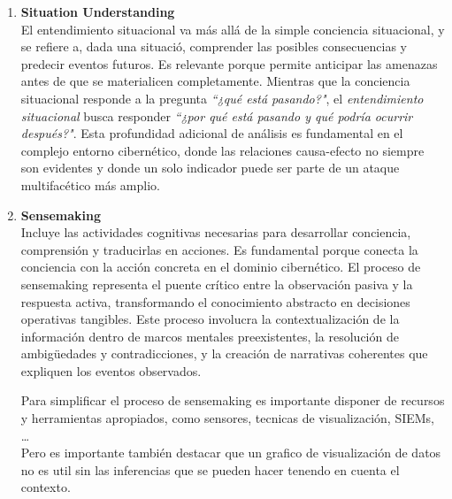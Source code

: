 \begin{enumerate}[resume]

\item \textbf{Situation Understanding} \\
El entendimiento situacional va más allá de la simple conciencia situacional, y se refiere a, dada una situació, comprender las posibles consecuencias y predecir eventos futuros. Es relevante porque permite anticipar las amenazas antes de que se materialicen completamente. Mientras que la conciencia situacional responde a la pregunta \textit{``¿qué está pasando?"}, el \textit{entendimiento situacional} busca responder \textit{``¿por qué está pasando y qué podría ocurrir después?"}. Esta profundidad adicional de análisis es fundamental en el complejo entorno cibernético, donde las relaciones causa-efecto no siempre son evidentes y donde un solo indicador puede ser parte de un ataque multifacético más amplio.
\nl


\item \textbf{Sensemaking} \\
Incluye las actividades cognitivas necesarias para desarrollar conciencia, comprensión y traducirlas en acciones. Es fundamental porque conecta la conciencia con la acción concreta en el dominio cibernético. El proceso de sensemaking representa el puente crítico entre la observación pasiva y la respuesta activa, transformando el conocimiento abstracto en decisiones operativas tangibles. Este proceso involucra la contextualización de la información dentro de marcos mentales preexistentes, la resolución de ambigüedades y contradicciones, y la creación de narrativas coherentes que expliquen los eventos observados.

Para simplificar el proceso de sensemaking es importante disponer de recursos y herramientas apropiados, como sensores, tecnicas de visualización, SIEMs, \dots\\
Pero es importante también destacar que un grafico de visualización de datos no es util sin las inferencias que se pueden hacer tenendo en cuenta el contexto. 
\end{enumerate}

